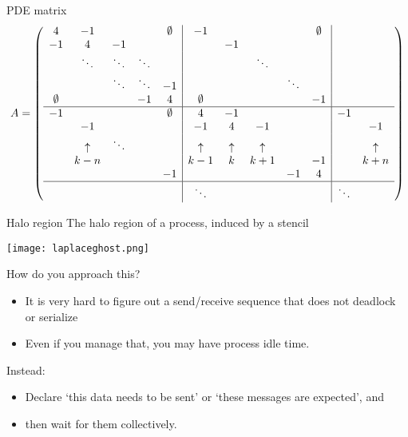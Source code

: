 \begin{numberedframe}{PDE matrix}
  \footnotesize
  \[
    A=
    \left(\begin{array}{ccccc|ccccc|cc}
      4&-1&&&\emptyset&-1&&&&\emptyset&\\ 
      -1&4&-1&&&&-1&&&&\\ 
      &\ddots&\ddots&\ddots&&&&\ddots&&\\ 
      &&\ddots&\ddots&-1&&&&\ddots&\\ 
      \emptyset&&&-1&4&\emptyset&&&&-1&\\ \hline
      -1&&&&\emptyset&4&-1&&&&-1\\
      &-1      &      &&&-1      &4       &-1      &&&&-1\\
      &\uparrow&\ddots&&&\uparrow&\uparrow&\uparrow&&  &&\uparrow\\
      &k-n     &      &&&k-1     &k       &k+1     &&-1&&k+n\\
      &&&&-1&&&&-1&4&&\\ \hline
      &        &      &&&\ddots  &        &        &&  &\ddots\\
    \end{array}\right)
    \]
\end{numberedframe}

\begin{numberedframe}{Halo region}
  The halo region of a process, induced by a stencil

  \texttt{[image: laplaceghost.png]}
\end{numberedframe}

\begin{numberedframe}{How do you approach this?}
  \begin{itemize}
  \item It is very hard to figure out a send/receive sequence that
    does not deadlock or serialize
  \item Even if you manage that, you may have process idle time.
  \end{itemize}
  Instead: 
  \begin{itemize}
  \item Declare `this data needs to be sent' or `these messages are expected', and
  \item then wait for them collectively.
  \end{itemize}
\end{numberedframe}

